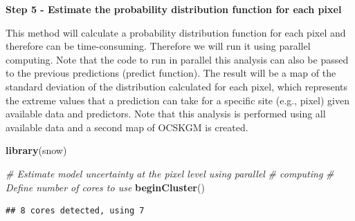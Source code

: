 \documentclass[10pt,b5paper,]{book}
\newenvironment{Shaded}{\begin{snugshade}}{\end{snugshade}}
\newcommand{\CommentTok}[1]{\textcolor[rgb]{0.56,0.35,0.01}{\textit{#1}}}
\newcommand{\DataTypeTok}[1]{\textcolor[rgb]{0.13,0.29,0.53}{#1}}
\newcommand{\KeywordTok}[1]{\textcolor[rgb]{0.13,0.29,0.53}{\textbf{#1}}}
\newcommand{\NormalTok}[1]{#1}
\newcommand{\OperatorTok}[1]{\textcolor[rgb]{0.81,0.36,0.00}{\textbf{#1}}}
\newcommand{\StringTok}[1]{\textcolor[rgb]{0.31,0.60,0.02}{#1}}
\theoremstyle{definition}
\theoremstyle{definition}
\theoremstyle{definition}
\theoremstyle{remark}
\begin{document}
\textbf{Step 5 - Estimate the probability distribution function for each
pixel}

This method will calculate a probability distribution function for each
pixel and therefore can be time-consuming. Therefore we will run it
using parallel computing. Note that the code to run in parallel this
analysis can also be passed to the previous predictions (predict
function). The result will be a map of the standard deviation of the
distribution calculated for each pixel, which represents the extreme
values that a prediction can take for a specific site (e.g., pixel)
given available data and predictors. Note that this analysis is
performed using all available data and a second map of OCSKGM is
created.

\begin{Shaded}
\begin{Highlighting}[]
\KeywordTok{library}\NormalTok{(snow)}

\CommentTok{# Estimate model uncertainty at the pixel level using parallel }
\CommentTok{# computing}
\CommentTok{# Define number of cores to use}
\KeywordTok{beginCluster}\NormalTok{()}
\end{Highlighting}
\end{Shaded}

\begin{verbatim}
## 8 cores detected, using 7
\end{verbatim}

\begin{Shaded}
\end{Shaded}
\end{document}
